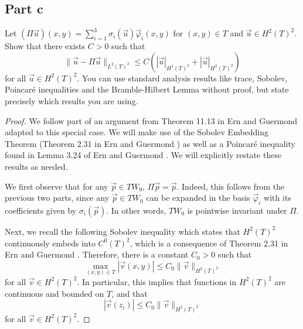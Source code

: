 \documentclass{article}
\begin{document}
\subsection*{Part c}
Let $(\Pi\vec u)(x,y) = \sum_{i=1}^3\sigma_i(\vec u)\vec\varphi_i(x,y)$ for $(x,y) \in T$ and $\vec u \in H^2(T)^2$.
Show that there exists $C > 0$ such that
\[\|\vec u - \Pi\vec u\|_{L^2(T)^2} \leq C(|\vec u|_{H^1(T)^2} + |\vec u|_{H^2(T)^2})\]
for all $\vec u \in H^2(T)^2$.
You can use standard analysis results like trace, Sobolev, Poincar\'e inequalities and the Bramble-Hilbert Lemma without proof, but state precisely which results you are using.
\begin{proof}
	We follow part of an argument from Theorem 11.13 in Ern and Guermond \cite{EG21} adapted to this special case.
	We will make use of the Sobolev Embedding Theorem (Theorem 2.31 in Ern and Guermond \cite{EG21}) as well as a Poincar\'e inequality found in Lemma 3.24 of Ern and Guermond \cite{EG21}.
	We will explicitly restate these results as needed.

	We first observe that for any $\vec p \in TW_0$, $\Pi\vec p = \vec p$.
	Indeed, this follows from the previous two parts, since any $\vec p \in TW_0$ can be expanded in the basis $\vec \varphi_i$ with its coefficients given by $\sigma_i(\vec p)$.
	In other words, $TW_0$ is pointwise invariant under $\Pi$.

	Next, we recall the following Sobolev inequality which states that $H^2(T)^2$ continuously embeds into $C^0(T)^2$, which is a consequence of Theorem 2.31 in Ern and Guermond \cite{EG21}.
	Therefore, there is a constant $C_0 > 0$ such that
	\begin{equation}
		\max_{(x,y) \in T}|\vec v(x,y)| \leq C_0\|\vec v\|_{H^2(T)^2}
	\end{equation}
	for all $\vec v \in H^2(T)^2$.
	In particular, this implies that functions in $H^2(T)^2$ are continuous and bounded on $T$, and that
	\begin{equation}
		|\vec v(z_i)| \leq C_0\|\vec v\|_{H^2(T)^2}
	\end{equation}
	for all $\vec v \in H^2(T)^2$.


\end{proof}
\end{document}
